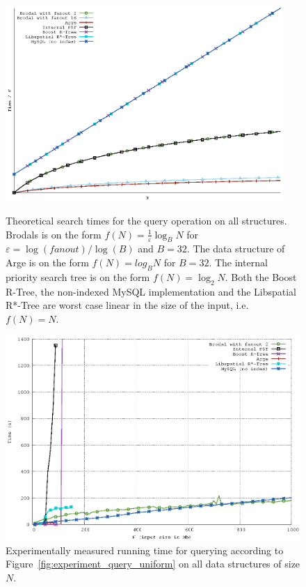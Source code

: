 \documentclass[twoside,11pt,openright]{report}
\def \epsilon {\varepsilon}
\begin{document}
\begin{figure}[H]
\centering
\includegraphics[width=0.94\textwidth]{../plots/query_complexities/query_complexity}
\caption{Theoretical search times for the query operation on all structures. Brodals is on the form $f(N) = \frac{1}{\epsilon}\log_B N$ for $\epsilon = \log(fanout) / \log(B)$ and $B = 32$. The data structure of Arge is on the form $f(N) = log_B N$ for $B = 32$. The internal priority search tree is on the form $f(N) = \log_2 N$. Both the Boost R-Tree, the non-indexed MySQL implementation and the Libspatial R*-Tree are worst case linear in the size of the input, i.e. $f(N) = N$.}
\label{fig:theory_query_complexity}
\includegraphics[width=\textwidth]{../src/experiments/query_experiment_results/final2/time}
\caption{Experimentally measured running time for querying according to Figure~\ref{fig:experiment_query_uniform} on all data structures of size $N$.}
\label{fig:result_query_search_complexity}
\end{figure}
\end{document}
